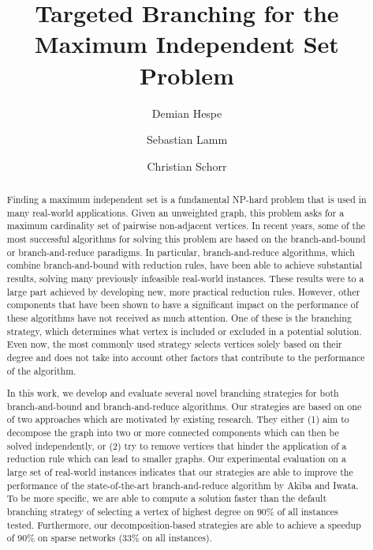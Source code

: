 \documentclass[a4paper,UKenglish,cleveref, autoref, thm-restate]{lipics-v2021}
\title{Targeted Branching for the Maximum Independent Set Problem} %
\author{Demian Hespe}{Karlsruhe Institute of Technology, Institute for
  Theoretical Informatics,
  Germany}{hespe@kit.edu}{https://orcid.org/0000-0001-6232-2951}{Partially supported by the Supercomputing \& Big Data Project (PoF-III of the Helmholtz Association)}
\author{Sebastian Lamm}{Karlsruhe Institute of Technology, Institute for
  Theoretical Informatics, Germany}{lamm@kit.edu}{https://orcid.org/0000-0001-7828-921X}{Partially supported by the Supercomputing \& Big Data Project (PoF-III of the Helmholtz Association) and by the Engineering Digital Futures Project (PoF-IV of the Helmholtz Association)}
\author{Christian Schorr}{Karlsruhe Institute of Technology, Institute for
  Theoretical Informatics, Germany}{christian.schorr@student.kit.edu}{}{}
\begin{document}
\maketitle

\begin{abstract}
  Finding a maximum independent set is a fundamental NP-hard problem that is used in many real-world applications.
Given an unweighted graph, this problem asks for a maximum cardinality set of pairwise non-adjacent vertices.
In recent years, some of the most successful algorithms for solving this problem are based on the branch-and-bound or branch-and-reduce paradigms.
In particular, branch-and-reduce algorithms, which combine branch-and-bound with reduction rules, have been able to achieve substantial results, solving many previously infeasible real-world instances.
These results were to a large part achieved by developing new, more practical reduction rules.
However, other components that have been shown to have a significant impact on the performance of these algorithms have not received as much attention.
One of these is the branching strategy, which determines what vertex is included or excluded in a potential solution.
Even now, the most commonly used strategy selects vertices solely based on their degree and does not take into account other factors that contribute to the performance of the algorithm.

In this work, we develop and evaluate several novel branching strategies for both branch-and-bound and branch-and-reduce algorithms.
Our strategies are based on one of two approaches which are motivated by existing research. 
They either (1) aim to decompose the graph into two or more connected components which can then be solved independently, or (2) try to remove vertices that hinder the application of a reduction rule which can lead to smaller graphs.
Our experimental evaluation on a large set of real-world instances indicates
that our strategies are able to improve the performance of the state-of-the-art
branch-and-reduce algorithm by Akiba and Iwata. To be more specific,
we are able to compute a solution faster than the default branching strategy of selecting a vertex of highest degree on $90\%$ of all instances tested.
Furthermore, our decomposition-based strategies are able to achieve a speedup of $90\%$ on sparse networks ($33\%$ on all instances).

\end{abstract}

\newpage
\end{document}
